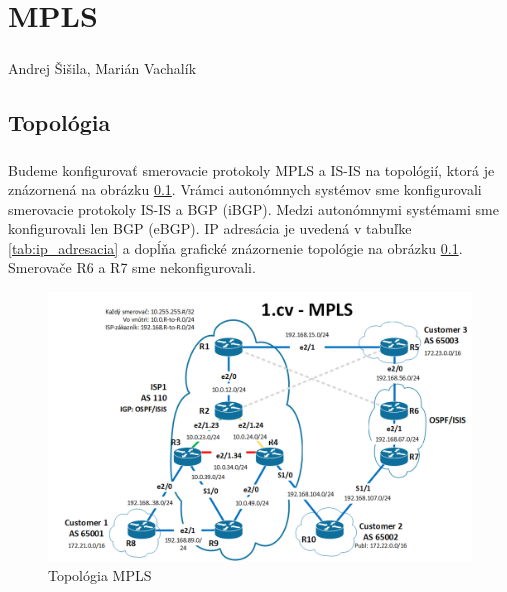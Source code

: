 \documentclass[12pt,twoside,a4paper]{report}
\begin{document}

\setcounter{chapter}{1}
\chapter*{MPLS}
\paragraph{}
Andrej Šišila, Marián Vachalík

\tableofcontents

\newpage
\section{Topológia}
\paragraph{}
Budeme konfigurovať smerovacie protokoly MPLS a IS-IS na topológií, ktorá je znázornená na obrázku \ref{fig:mpls_isis_topo}. Vrámci autonómnych systémov sme konfigurovali smerovacie protokoly IS-IS a BGP (iBGP). Medzi autonómnymi systémami sme konfigurovali len BGP (eBGP). IP adresácia je uvedená v tabuľke \ref{tab:ip_adresacia} a dopĺňa grafické znázornenie topológie na obrázku \ref{fig:mpls_isis_topo}. Smerovače R6 a R7 sme nekonfigurovali.

\begin{figure}[!htbp]
\centering
\includegraphics[width=14cm,keepaspectratio]{mpls_isis_topo}
\caption{Topológia MPLS}
\label{fig:mpls_isis_topo}
\end{figure}
\end{document}
